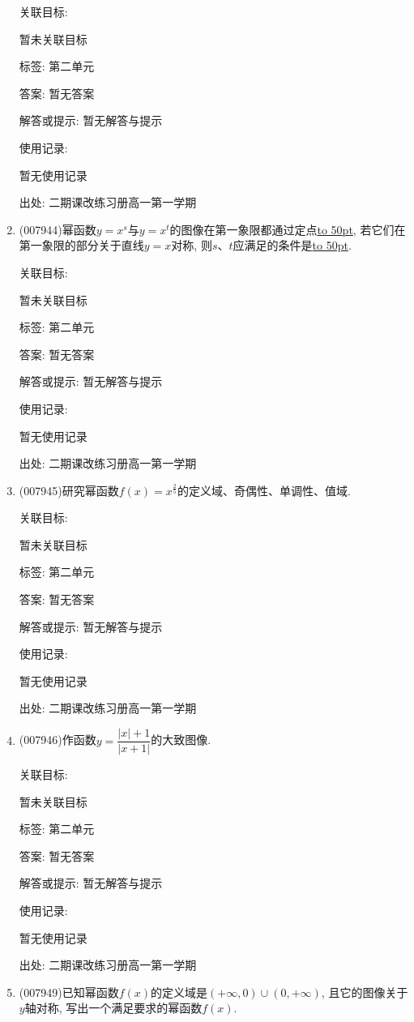 \documentclass[10pt,a4paper]{article}
\newcommand{\blank}[1]{\underline{\hbox to #1pt{}}}
\begin{document}
\begin{enumerate}[1.]
关联目标:

暂未关联目标



标签: 第二单元

答案: 暂无答案

解答或提示: 暂无解答与提示

使用记录:

暂无使用记录


出处: 二期课改练习册高一第一学期
\item { (007944)}幂函数$y=x^s$与$y=x^t$的图像在第一象限都通过定点\blank{50}, 若它们在第一象限的部分关于直线$y=x$对称, 则$s$、$t$应满足的条件是\blank{50}.


关联目标:

暂未关联目标



标签: 第二单元

答案: 暂无答案

解答或提示: 暂无解答与提示

使用记录:

暂无使用记录


出处: 二期课改练习册高一第一学期
\item { (007945)}研究幂函数$f(x)=x^{\frac 25}$的定义域、奇偶性、单调性、值域.


关联目标:

暂未关联目标



标签: 第二单元

答案: 暂无答案

解答或提示: 暂无解答与提示

使用记录:

暂无使用记录


出处: 二期课改练习册高一第一学期
\item { (007946)}作函数$y=\dfrac{|x|+1}{|x+1|}$的大致图像.


关联目标:

暂未关联目标



标签: 第二单元

答案: 暂无答案

解答或提示: 暂无解答与提示

使用记录:

暂无使用记录


出处: 二期课改练习册高一第一学期
\item { (007949)}已知幂函数$f(x)$的定义域是$(+\infty ,0)\cup (0,+\infty)$, 且它的图像关于$y$轴对称, 写出一个满足要求的幂函数$f(x)$.



\end{enumerate}
\end{document}
